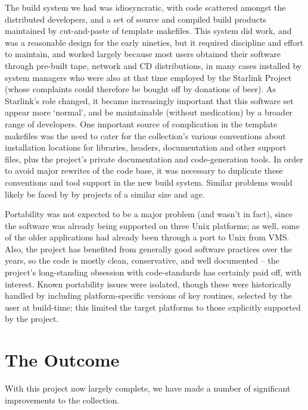 \documentclass{speauth}
\begin{document}
The build system we had was idiosyncratic, with code scattered amongst
the distributed developers, and a set of source and compiled build
products maintained by cut-and-paste of template makefiles.  This
system did work, and was a reasonable design for the early nineties,
but it required discipline and effort to maintain, and worked largely
because most users obtained their software through pre-built tape, network and
CD distributions, in many cases installed by system managers who were
also at that time employed by the Starlink Project (whose complaints
could therefore be bought off by donations of beer).  As Starlink's
role changed, it became increasingly important that this software set
appear more `normal', and be maintainable (without medication) by a
broader range of developers.  One important source of complication in the
template makefiles was the need to cater for the collection's various
conventions about installation locations for libraries, headers,
documentation and other support files, plus the project's private
documentation and code-generation tools.  In order to avoid major
rewrites of the code base, it was necessary to duplicate these
conventions and tool support in the new build system.  Similar
problems would likely be faced by by projects of a similar size and age.

Portability was not expected to be a major problem (and wasn't in
fact), since the software was already being supported on three Unix
platforms; as well, some of the older applications had already been
through a port to Unix from VMS.  Also, the project has benefited from
generally good software practices over the years, so the code is
mostly clean, conservative, and well documented -- the project's
long-standing obsession with code-standards has certainly paid off,
with interest.  Known portability issues were isolated, though these
were historically handled by including platform-specific versions of
key routines, selected by the user at build-time; this limited the
target platforms to those explicitly supported by the project.




\section{The Outcome}
\label{s:result}

With this project now largely complete, we have made a number of
significant improvements to the collection.
\end{document}
